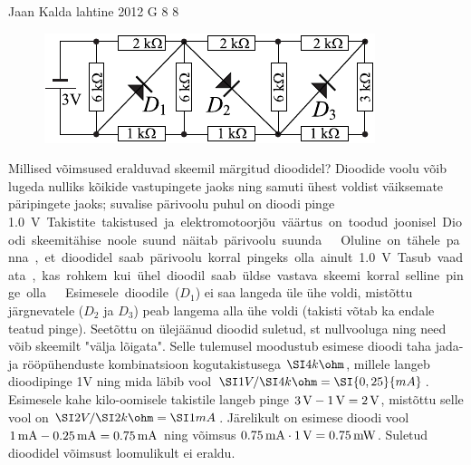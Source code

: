 {Jaan Kalda} %
{lahtine} %
{2012} %
{G 8} %
{8} %
{
\ifStatement
\begin{figure}
\includegraphics[width=\linewidth]{2012-lahg-08-dioodid}
\end{figure}
Millised võimsused eralduvad skeemil märgitud dioodidel? Dioodide voolu võib lugeda
nulliks kõikide vastupingete jaoks ning samuti ühest voldist
väiksemate päripingete jaoks; suvalise pärivoolu puhul on dioodi pinge
\SI{1,0}V. Takistite takistused ja elektromotoorjõu väärtus on toodud
joonisel. Dioodi skeemitähise noole suund näitab pärivoolu
suunda.
\fi


\ifHint
Oluline on tähele panna, et dioodidel saab pärivoolu korral pingeks olla ainult \SI{1,0}{V}. Tasub vaadata, kas rohkem kui ühel dioodil saab üldse vastava skeemi korral selline pinge olla.
\fi


\ifSolution
Esimesele dioodile ($D_1$) ei saa langeda üle ühe voldi, mistõttu järgnevatele ($D_2$ ja $D_3$) peab langema alla ühe voldi (takisti võtab ka endale teatud pinge).
Seetõttu on ülejäänud dioodid suletud, st nullvooluga ning need võib skeemilt "välja lõigata". Selle tulemusel moodustub esimese dioodi taha 
jada- ja rööpühenduste kombinatsioon kogutakistusega $\SI 4{k\ohm}$, millele langeb dioodipinge 1V ning mida läbib vool $\SI 1V /\SI 4{k\ohm}= \SI {0,25}{mA}$. 
Esimesele kahe kilo-oomisele takistile langeb pinge $\SI 3V-\SI 1V=\SI 2V$, mistõttu selle vool on $\SI 2V/\SI 2{k\ohm}=\SI 1{mA}$. Järelikult on esimese dioodi vool
$\SI 1{mA}-\SI {0,25}{mA}=\SI{0,75}{mA}$ ning võimsus $\SI{0,75}{mA}\cdot \SI 1V=\SI{0,75}{mW}$. Suletud dioodidel võimsust loomulikult ei eraldu.
\fi


}
